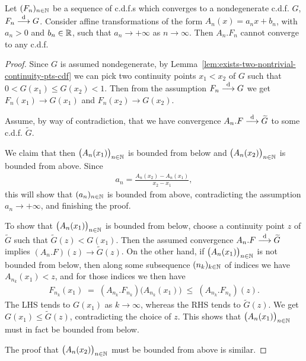 \begin{lemma}
  \label{lem:impossible-expanding-limit}
  \leanok
  Let $(F_n)_{n \in \mathbb{N}}$ be a sequence of c.d.f.s which converges to a nondegenerate
  c.d.f. $G$, $F_n \overset{\mathrm{d}}{\longrightarrow} G$. Consider affine transformations of the form $A_n(x) = a_n x + b_n$,
  with $a_n > 0$ and $b_n \in \mathbb{R}$, such that $a_n \to +\infty$
  as $n \to \infty$. Then $A_n . F_n$ cannot converge to any c.d.f.
\end{lemma}
\begin{proof}
  \leanok
  Since $G$ is assumed nondegenerate, by Lemma~\ref{lem:exists-two-nontrivial-continuity-pts-cdf}
  we can pick two continuity points $x_1 < x_2$
  of $G$ such that $0 < G(x_1) \le G(x_2) < 1$. Then from the assumption
  $F_n \overset{\mathrm{d}}{\longrightarrow} G$ we get $F_n(x_1) \to G(x_1)$ and $F_n(x_2) \to G(x_2)$.

  Assume, by way of contradiction, that we have convergence
  $A_n . F \overset{\mathrm{d}}{\longrightarrow} \widetilde{G}$ to some c.d.f. $\widetilde{G}$.

  We claim that then $\big(A_n(x_1)\big)_{n \in \mathbb{N}}$ is bounded from below and
  $\big(A_n(x_2)\big)_{n \in \mathbb{N}}$ is bounded from above.
  Since
  \begin{align*}
    a_n = \frac{A_n(x_2) - A_n(x_1)}{x_2 - x_1} ,
  \end{align*}
  this will show that $(a_n)_{n \in \mathbb{N}}$ is bounded from above, contradicting
  the assumption $a_n \to +\infty$, and finishing the proof.

  To show that $\big(A_n(x_1)\big)_{n \in \mathbb{N}}$ is bounded from below,
  choose a continuity point $z$ of $\widetilde{G}$ such that
  $\widetilde{G}(z) < G(x_1)$. Then the assumed convergence
  $A_n . F \overset{\mathrm{d}}{\longrightarrow} \widetilde{G}$ implies
  $(A_n . F)(z) \to \widetilde{G}(z)$.
  On the other hand, if $\big(A_n(x_1)\big)_{n \in \mathbb{N}}$ is not
  bounded from below, then along some subsequence $(n_k)_{k \in \mathbb{N}}$ of indices
  we have $A_{n_k}(x_1) < z$, and for those indices we then have
  \begin{align*}
    F_{n_k}(x_1) \; = \; (A_{n_k} . F_{n_k}) \big( A_{n_k}(x_1) \big)
      \; \le \; (A_{n_k} . F_{n_k})(z) .
  \end{align*}
  The LHS tends to $G(x_1)$ as $k \to \infty$, whereas the RHS tends
  to $\widetilde{G}(z)$. We get $G(x_1) \le \widetilde{G}(z)$, contradicting
  the choice of $z$. This shows that $\big(A_n(x_1)\big)_{n \in \mathbb{N}}$ must
  in fact be bounded from below.

  The proof that $\big(A_n(x_2)\big)_{n \in \mathbb{N}}$ must be bounded from above
  is similar.
\end{proof}

